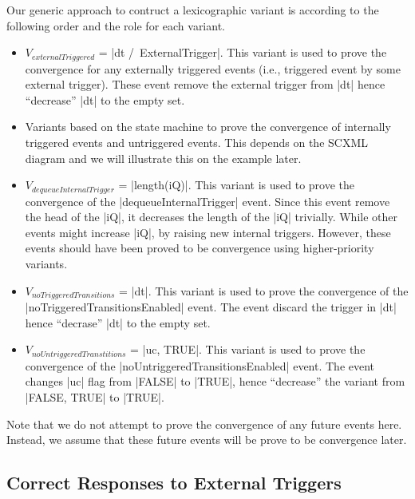 Our generic approach to contruct a lexicographic variant is according
to the following order and the role for each variant.
\begin{itemize}
\item $V_{externalTriggered}$ = |dt /\ ExternalTrigger|.  This variant
  is used to prove the convergence for any externally triggered events
  (i.e., triggered event by some external trigger). These event remove
  the external trigger from |dt| hence ``decrease'' |dt| to the empty
  set.

\item Variants based on the state machine to prove the convergence of
  internally triggered events and untriggered events.  This depends on
  the SCXML diagram and we will illustrate this on the example later.
  
\item $V_{dequeueInternalTrigger}$ = |length(iQ)|.  This variant is
  used to prove the convergence of the |dequeueInternalTrigger| event.
  Since this event remove the head of the |iQ|, it decreases the
  length of the |iQ| trivially.  While other events might increase
  |iQ|, by raising new internal triggers. However, these events should
  have been proved to be convergence using higher-priority variants.
  
\item $V_{noTriggeredTransitions}$ = |dt|.  This variant is used to
  prove the convergence of the |noTriggeredTransitionsEnabled| event.
  The event discard the trigger in |dt| hence ``decrase'' |dt| to the
  empty set.
  
\item $V_{noUntriggeredTranstitions}$ = |{uc, TRUE}|.  This variant is
  used to prove the convergence of the
  |noUntriggeredTransitionsEnabled| event.  The event changes |uc|
  flag from |FALSE| to |TRUE|, hence ``decrease'' the variant from
  |{FALSE, TRUE}| to |{TRUE}|.
\end{itemize}
Note that we do not attempt to prove the convergence of any future
events here. Instead, we assume that these future events will be prove
to be convergence later.



\subsection{Correct Responses to External Triggers}
\label{sec:corr-resp-extern}


